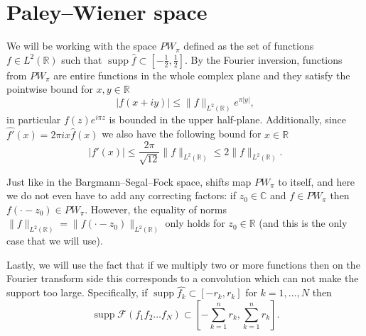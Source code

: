 \documentclass[12pt]{amsart}
\numberwithin{equation}{section}
\newcommand{\R}{\mathbb{R}}
\newcommand{\Cm}{\mathbb{C}}
\DeclareMathOperator{\supp}{supp} \DeclareMathOperator{\trace}{tr}
\newcommand{\F}{\mathcal{F}}
\begin{document}
\section{Paley--Wiener space}
We will be working with the space $PW_\pi$ defined as the set of functions $f\in L^2(\R)$ such that $\supp \hat{f}\subset [-\frac{1}{2},\frac{1}{2}]$. By the Fourier inversion, functions from $PW_\pi$ are entire functions in the whole complex plane and they satisfy the pointwise bound for $x, y\in\R$
$$|f(x+iy)|\le \|f\|_{L^2(\R)}e^{\pi |y|},$$
in particular $f(z)e^{i\pi z}$ is bounded in the upper half-plane. Additionally, since $\widehat{f'}(x) = 2\pi i x \hat{f}(x)$ we also have the following bound  for $x\in \R$
$$|f'(x)|\le \frac{2\pi}{\sqrt{12}}\|f\|_{L^2(\R)} \le 2\|f\|_{L^2(\R)}.$$

Just like in the Bargmann--Segal--Fock space, shifts map $PW_\pi$ to itself, and here we do not even have to add any correcting factors: if $z_0\in \Cm$ and $f\in PW_\pi$ then $f(\cdot - z_0)\in PW_\pi$. However, the equality of norms $\|f\|_{L^2(\R)} = \|f(\cdot - z_0)\|_{L^2(\R)}$ only holds for $z_0\in\R$ (and this is the only case that we will use).

Lastly, we will use the fact that if we multiply two or more functions then on the Fourier transform side this corresponds to a convolution which can not make the support too large. Specifically, if $\supp \widehat{f_k}\subset [-r_k, r_k]$ for $k = 1, \ldots , N$ then 
$$\supp \F(f_1f_2\ldots f_N)\subset \left[-\sum_{k=1}^n r_k, \sum_{k=1}^n r_k\right].$$
\end{document}
